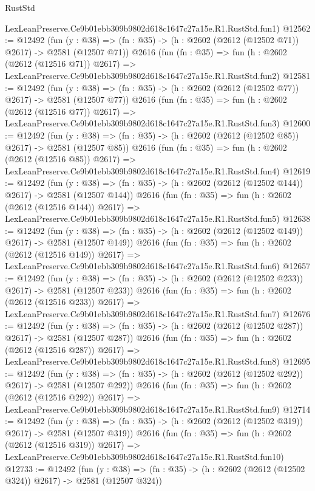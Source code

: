\begin{lexlean}{RustStd}
\begin{coremodule}
    LexLeanPreserve.Ce9b01ebb309b9802d618c1647c27a15e.R1.RustStd.fun1)
@12562 := @12492
    (fun (y : @38) => (fn : @35) -> (h : @2602 (@2612 (@12502 @71)) @2617) -> @2581 (@12507 @71))
    @2616
    (fun (fn : @35) =>
    fun (h : @2602 (@2612 (@12516 @71)) @2617) =>
    LexLeanPreserve.Ce9b01ebb309b9802d618c1647c27a15e.R1.RustStd.fun2)
@12581 := @12492
    (fun (y : @38) => (fn : @35) -> (h : @2602 (@2612 (@12502 @77)) @2617) -> @2581 (@12507 @77))
    @2616
    (fun (fn : @35) =>
    fun (h : @2602 (@2612 (@12516 @77)) @2617) =>
    LexLeanPreserve.Ce9b01ebb309b9802d618c1647c27a15e.R1.RustStd.fun3)
@12600 := @12492
    (fun (y : @38) => (fn : @35) -> (h : @2602 (@2612 (@12502 @85)) @2617) -> @2581 (@12507 @85))
    @2616
    (fun (fn : @35) =>
    fun (h : @2602 (@2612 (@12516 @85)) @2617) =>
    LexLeanPreserve.Ce9b01ebb309b9802d618c1647c27a15e.R1.RustStd.fun4)
@12619 := @12492
    (fun (y : @38) => (fn : @35) -> (h : @2602 (@2612 (@12502 @144)) @2617) -> @2581 (@12507 @144))
    @2616
    (fun (fn : @35) =>
    fun (h : @2602 (@2612 (@12516 @144)) @2617) =>
    LexLeanPreserve.Ce9b01ebb309b9802d618c1647c27a15e.R1.RustStd.fun5)
@12638 := @12492
    (fun (y : @38) => (fn : @35) -> (h : @2602 (@2612 (@12502 @149)) @2617) -> @2581 (@12507 @149))
    @2616
    (fun (fn : @35) =>
    fun (h : @2602 (@2612 (@12516 @149)) @2617) =>
    LexLeanPreserve.Ce9b01ebb309b9802d618c1647c27a15e.R1.RustStd.fun6)
@12657 := @12492
    (fun (y : @38) => (fn : @35) -> (h : @2602 (@2612 (@12502 @233)) @2617) -> @2581 (@12507 @233))
    @2616
    (fun (fn : @35) =>
    fun (h : @2602 (@2612 (@12516 @233)) @2617) =>
    LexLeanPreserve.Ce9b01ebb309b9802d618c1647c27a15e.R1.RustStd.fun7)
@12676 := @12492
    (fun (y : @38) => (fn : @35) -> (h : @2602 (@2612 (@12502 @287)) @2617) -> @2581 (@12507 @287))
    @2616
    (fun (fn : @35) =>
    fun (h : @2602 (@2612 (@12516 @287)) @2617) =>
    LexLeanPreserve.Ce9b01ebb309b9802d618c1647c27a15e.R1.RustStd.fun8)
@12695 := @12492
    (fun (y : @38) => (fn : @35) -> (h : @2602 (@2612 (@12502 @292)) @2617) -> @2581 (@12507 @292))
    @2616
    (fun (fn : @35) =>
    fun (h : @2602 (@2612 (@12516 @292)) @2617) =>
    LexLeanPreserve.Ce9b01ebb309b9802d618c1647c27a15e.R1.RustStd.fun9)
@12714 := @12492
    (fun (y : @38) => (fn : @35) -> (h : @2602 (@2612 (@12502 @319)) @2617) -> @2581 (@12507 @319))
    @2616
    (fun (fn : @35) =>
    fun (h : @2602 (@2612 (@12516 @319)) @2617) =>
    LexLeanPreserve.Ce9b01ebb309b9802d618c1647c27a15e.R1.RustStd.fun10)
@12733 := @12492
    (fun (y : @38) => (fn : @35) -> (h : @2602 (@2612 (@12502 @324)) @2617) -> @2581 (@12507 @324))

\end{coremodule}
\end{lexlean}
